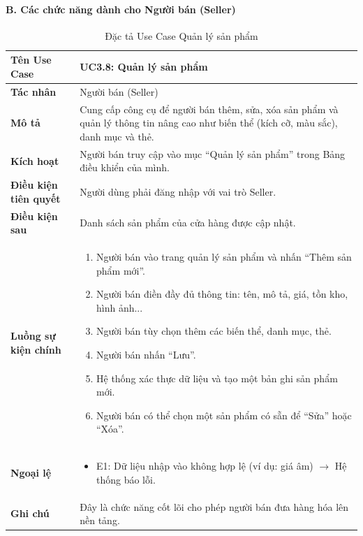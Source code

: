 \vspace{1cm}

\paragraph{B. Các chức năng dành cho Người bán (Seller)}

\begin{table}[H]
\centering
\begin{tabularx}{\textwidth}{|l|X|}
\hline
\textbf{Tên Use Case} & \textbf{UC3.8: Quản lý sản phẩm} \\ \hline
\textbf{Tác nhân} & Người bán (Seller) \\ \hline
\textbf{Mô tả} & Cung cấp công cụ để người bán thêm, sửa, xóa sản phẩm và quản lý thông tin nâng cao như biến thể (kích cỡ, màu sắc), danh mục và thẻ. \\ \hline
\textbf{Kích hoạt} & Người bán truy cập vào mục ``Quản lý sản phẩm'' trong Bảng điều khiển của mình. \\ \hline
\textbf{Điều kiện tiên quyết} & Người dùng phải đăng nhập với vai trò Seller. \\ \hline
\textbf{Điều kiện sau} & Danh sách sản phẩm của cửa hàng được cập nhật. \\ \hline
\textbf{Luồng sự kiện chính} & 
\begin{enumerate}
    \item Người bán vào trang quản lý sản phẩm và nhấn ``Thêm sản phẩm mới''.
    \item Người bán điền đầy đủ thông tin: tên, mô tả, giá, tồn kho, hình ảnh...
    \item Người bán tùy chọn thêm các biến thể, danh mục, thẻ.
    \item Người bán nhấn ``Lưu''.
    \item Hệ thống xác thực dữ liệu và tạo một bản ghi sản phẩm mới.
    \item Người bán có thể chọn một sản phẩm có sẵn để ``Sửa'' hoặc ``Xóa''.
\end{enumerate} \\ \hline
\textbf{Ngoại lệ} & 
\begin{itemize}
    \item E1: Dữ liệu nhập vào không hợp lệ (ví dụ: giá âm) $\rightarrow$ Hệ thống báo lỗi.
\end{itemize} \\ \hline
\textbf{Ghi chú} & Đây là chức năng cốt lõi cho phép người bán đưa hàng hóa lên nền tảng. \\ \hline
\end{tabularx}
\caption{Đặc tả Use Case Quản lý sản phẩm}
\end{table}

